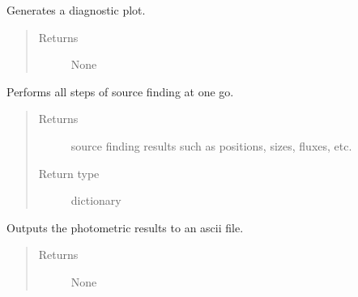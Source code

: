 \documentclass[a4paper,11pt,english]{sphinxmanual}
\begin{document}
\begin{fulllineitems}
\begin{fulllineitems}
\label{analysis:analysis.sourceFinder.sourceFinder.plot}
Generates a diagnostic plot.
\begin{quote}\begin{description}
\item[{Returns}] \leavevmode
None

\end{description}\end{quote}

\end{fulllineitems}


\begin{fulllineitems}
\label{analysis:analysis.sourceFinder.sourceFinder.runAll}
Performs all steps of source finding at one go.
\begin{quote}\begin{description}
\item[{Returns}] \leavevmode
source finding results such as positions, sizes, fluxes, etc.

\item[{Return type}] \leavevmode
dictionary

\end{description}\end{quote}

\end{fulllineitems}


\begin{fulllineitems}
\label{analysis:analysis.sourceFinder.sourceFinder.writePhotometry}
Outputs the photometric results to an ascii file.
\begin{quote}\begin{description}
\item[{Returns}] \leavevmode
None

\end{description}\end{quote}

\end{fulllineitems}


\end{fulllineitems}
\end{document}
